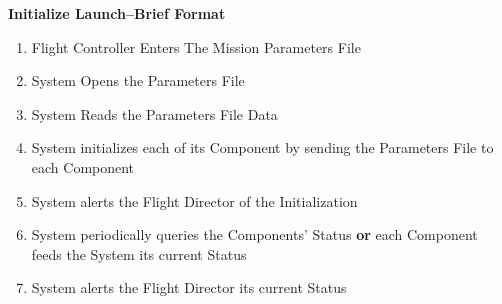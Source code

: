 \documentclass[letterpaper]{article}
\begin{document}
\noindent
\textbf{Initialize Launch--Brief Format}
\begin{enumerate}
   \item Flight Controller Enters The Mission Parameters File
   \item System Opens the Parameters File
   \item System Reads the Parameters File Data
   \item System initializes each of its Component by sending the
      Parameters File to each Component
   \item System alerts the Flight Director of the Initialization
   \item System periodically queries the Components’ Status 
      \textbf{or} each Component feeds the System its current Status
   \item System alerts the Flight Director its current Status
\end{enumerate}
\end{document}
